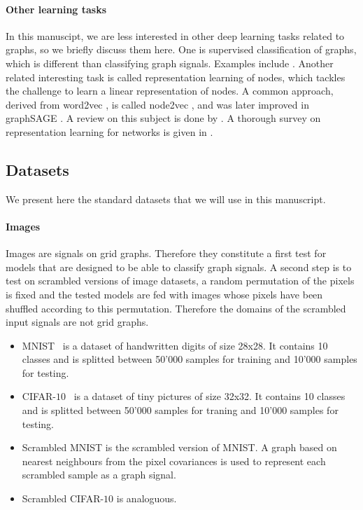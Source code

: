\paragraph{Other learning tasks}
In this manuscipt, we are less interested in other deep learning tasks related to graphs, so we briefly discuss them here. One is supervised classification of graphs, which is different than classifying graph signals. Examples include \citep{niepert2016learning,tixier2017classifying,nikolentzos2017kernel,bai2018quantum}. Another related interesting task is called representation learning of nodes, which tackles the challenge to learn a linear representation of nodes. A common approach, derived from word2vec \citep{mikolov2013efficient,mikolov2013distributed}, is called node2vec \citep{grover2016node2vec}, and was later improved in graphSAGE \citep{hamilton2017inductive}. A review on this subject is done by \cite{hamilton2017representation}. A thorough survey on representation learning for networks is given in \citep{zhang2017network}.

\subsection{Datasets}
\label{sec:datasets}

We present here the standard datasets that we will use in this manuscript.

\paragraph{Images}
Images are signals on grid graphs. Therefore they constitute a first test for models that are designed to be able to classify graph signals. A second step is to test on scrambled versions of image datasets, \ie a random permutation of the pixels is fixed and the tested models are fed with images whose pixels have been shuffled according to this permutation.
Therefore the domains of the scrambled input signals are not grid graphs.
\begin{itemize}
  \item MNIST~\citep{lecun1998mnist} is a dataset of handwritten digits of size 28x28. It contains 10 classes and is splitted between 50'000 samples for training and 10'000 samples for testing.
  \item CIFAR-$10$~\citep{krizhevsky2009learning} is a dataset of tiny pictures of size 32x32. It contains 10 classes and is splitted between 50'000 samples for traning and 10'000 samples for testing.
  \item Scrambled MNIST is the scrambled version of MNIST. A graph based on nearest neighbours from the pixel covariances is used to represent each scrambled sample as a graph signal.
  \item Scrambled CIFAR-$10$ is analoguous.
\end{itemize}

